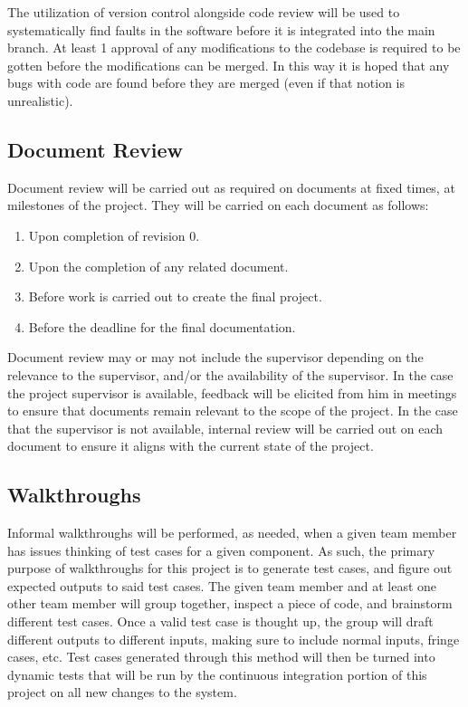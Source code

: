 \documentclass[12pt, titlepage]{article}
\begin{document}
The utilization of version control alongside code review will be used to systematically find faults in the software before it is integrated into the main branch. At least 1 approval of any modifications to the codebase is required to be gotten before the modifications can be merged. In this way it is hoped that any bugs with code are found before they are merged (even if that notion is unrealistic).

\subsection{Document Review}

Document review will be carried out as required on documents at fixed times, at milestones of the project. They will be carried on each document as follows:

\begin{enumerate}
    \item Upon completion of revision 0.
    \item Upon the completion of any related document.
    \item Before work is carried out to create the final project.
    \item Before the deadline for the final documentation.
\end{enumerate}

\noindent Document review may or may not include the supervisor depending on the relevance to the supervisor, and/or the availability of the supervisor. In the case the project supervisor is available, feedback will be elicited from him in meetings to ensure that documents remain relevant to the scope of the project. In the case that the supervisor is not available, internal review will be carried out on each document to ensure it aligns with the current state of the project.

\subsection{Walkthroughs}

Informal walkthroughs will be performed, as needed, when a given team member has issues thinking of test cases for a given component. As such, the primary purpose of walkthroughs for this project is to generate test cases, and figure out expected outputs to said test cases. The given team member and at least one other team member will group together, inspect a piece of code, and brainstorm different test cases. Once a valid test case is thought up, the group will draft different outputs to different inputs, making sure to include normal inputs, fringe cases, etc. Test cases generated through this method will then be turned into dynamic tests that will be run by the continuous integration portion of this project on all new changes to the system.
\end{document}
